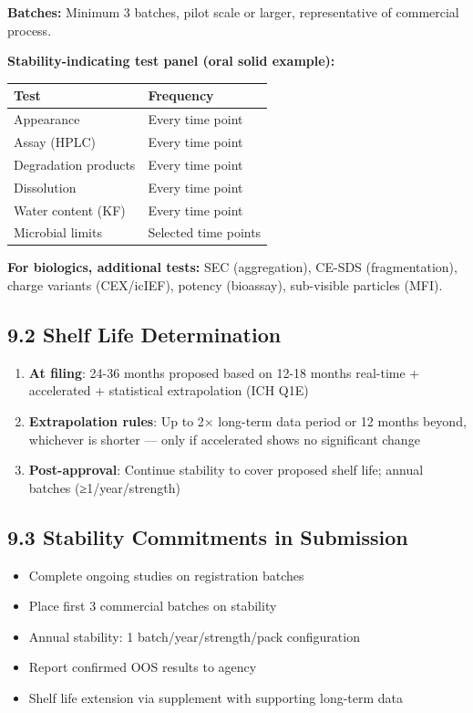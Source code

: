 \documentclass[
  11pt,
  a4paper,
]{report}
\providecommand{\tightlist}{%
  \setlength{\itemsep}{0pt}\setlength{\parskip}{0pt}}
\begin{document}
\textbf{Batches:} Minimum 3 batches, pilot scale or larger,
representative of commercial process.

\textbf{Stability-indicating test panel (oral solid example):}

\begin{longtable}[]{@{}ll@{}}
\toprule
Test & Frequency\tabularnewline
\midrule
\endhead
Appearance & Every time point\tabularnewline
Assay (HPLC) & Every time point\tabularnewline
Degradation products & Every time point\tabularnewline
Dissolution & Every time point\tabularnewline
Water content (KF) & Every time point\tabularnewline
Microbial limits & Selected time points\tabularnewline
\bottomrule
\end{longtable}

\textbf{For biologics, additional tests:} SEC (aggregation), CE-SDS
(fragmentation), charge variants (CEX/icIEF), potency (bioassay),
sub-visible particles (MFI).

\hypertarget{shelf-life-determination}{%
\subsection{9.2 Shelf Life
Determination}\label{shelf-life-determination}}

\begin{enumerate}
\def\labelenumi{\arabic{enumi}.}
\tightlist
\item
  \textbf{At filing}: 24-36 months proposed based on 12-18 months
  real-time + accelerated + statistical extrapolation (ICH Q1E)
\item
  \textbf{Extrapolation rules}: Up to 2× long-term data period or 12
  months beyond, whichever is shorter --- only if accelerated shows no
  significant change
\item
  \textbf{Post-approval}: Continue stability to cover proposed shelf
  life; annual batches (≥1/year/strength)
\end{enumerate}

\hypertarget{stability-commitments-in-submission}{%
\subsection{9.3 Stability Commitments in
Submission}\label{stability-commitments-in-submission}}

\begin{itemize}
\tightlist
\item
  Complete ongoing studies on registration batches
\item
  Place first 3 commercial batches on stability
\item
  Annual stability: 1 batch/year/strength/pack configuration
\item
  Report confirmed OOS results to agency
\item
  Shelf life extension via supplement with supporting long-term data
\end{itemize}
\end{document}
